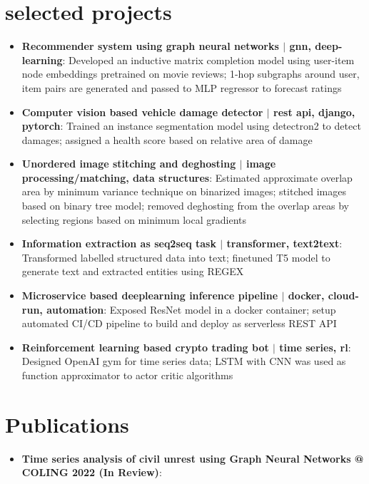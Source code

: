 \documentclass[a4paper,20pt]{article}
\newcommand{\resumeItem}[2]{
  \item\small{
    \textbf{#1}{: #2 \vspace{-2pt}}
  }
}
\newcommand{\resumeSubItem}[2]{\resumeItem{#1}{#2}\vspace{-3pt}}
\newcommand{\resumeSubHeadingListStart}{\begin{itemize}[leftmargin=*]}
\newcommand{\resumeSubHeadingListEnd}{\end{itemize}}
\begin{document}
\section{selected projects}
\resumeSubHeadingListStart
\resumeSubItem{Recommender system using graph neural networks \(|\) gnn, deep-learning}{Developed an inductive matrix completion model using user-item node embeddings pretrained on movie reviews; 1-hop subgraphs around user, item pairs are generated and passed to MLP regressor to forecast ratings}
\vspace{2pt}
\resumeSubItem{Computer vision based vehicle damage detector \(|\) rest api, django, pytorch}{Trained an instance segmentation model using detectron2 to detect damages; assigned a health score based on relative area of damage}
\vspace{2pt}
\resumeSubItem{Unordered image stitching and deghosting \(|\) image processing/matching, data structures}{Estimated approximate overlap area by minimum variance technique on binarized images; stitched images based on binary tree model; removed deghosting from the overlap areas by selecting regions based on minimum local gradients}
\vspace{2pt}
\resumeSubItem{Information extraction as seq2seq task \(|\) transformer, text2text}{Transformed labelled structured data into text; finetuned T5 model to generate text and extracted entities using REGEX}
\vspace{2pt}
\resumeSubItem{Microservice based deeplearning inference pipeline \(|\) docker, cloud-run, automation}{Exposed ResNet model in a docker container; setup automated CI/CD pipeline to build and deploy as serverless REST API}
\vspace{2pt}
\resumeSubItem{Reinforcement learning based crypto trading bot \(|\) time series, rl}{Designed OpenAI gym for time series data; LSTM with CNN was used as function approximator to actor critic algorithms}
\resumeSubHeadingListEnd
\vspace{-5pt}
\section{Publications}

\resumeSubHeadingListStart
\resumeSubItem{Time series analysis of civil unrest using Graph Neural Networks @ COLING 2022 (In Review)}{}
\vspace{2pt}
\resumeSubHeadingListEnd
\end{document}
